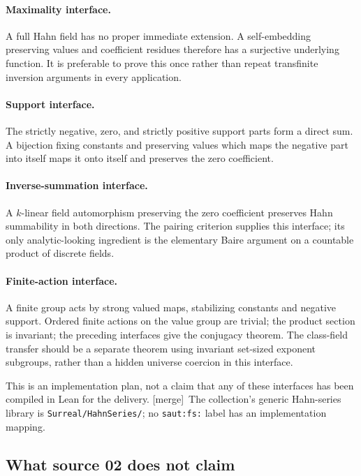 \documentclass[11pt]{article}
\theoremstyle{definition}
\theoremstyle{remark}
\newcommand{\mergetag}{\textup{[merge]}}
\numberwithin{equation}{section}
\begin{document}
\paragraph{Maximality interface.} A full Hahn field has no proper immediate extension.
A self-embedding preserving values and coefficient residues therefore has a surjective
underlying function. It is preferable to prove this once rather than repeat
transfinite inversion arguments in every application.

\paragraph{Support interface.} The strictly negative, zero, and strictly positive
support parts form a direct sum. A bijection fixing constants and preserving values
which maps the negative part into itself maps it onto itself and preserves the zero
coefficient.

\paragraph{Inverse-summation interface.} A $k$-linear field automorphism preserving
the zero coefficient preserves Hahn summability in both directions. The pairing
criterion supplies this interface; its only analytic-looking ingredient is the
elementary Baire argument on a countable product of discrete fields.

\paragraph{Finite-action interface.} A finite group acts by strong valued maps,
stabilizing constants and negative support. Ordered finite actions on the value group
are trivial; the product section is invariant; the preceding interfaces give the
conjugacy theorem. The class-field transfer should be a separate theorem using
invariant set-sized exponent subgroups, rather than a hidden universe coercion in this
interface.

This is an implementation plan, not a claim that any of these interfaces has been
compiled in Lean for the delivery. \mergetag\ The collection's generic Hahn-series
library is \nolinkurl{Surreal/HahnSeries/}; no \texttt{saut:fs:} label has an
implementation mapping.

\subsection{What source 02 does not claim}\label{saut:fs:sec:nonclaims}
\end{document}
